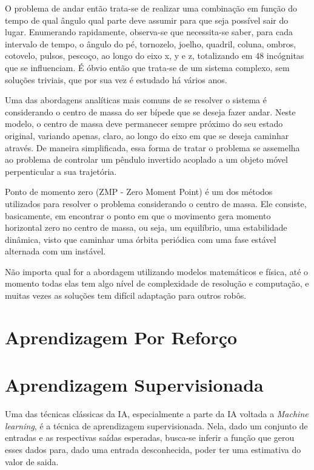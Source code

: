 \documentclass[twoside,conference,a4paper]{IEEEtran}
\begin{document}
O problema de andar então trata-se de realizar uma combinação em função do tempo de qual ângulo qual parte deve assumir para que seja possível sair do lugar. Enumerando rapidamente, observa-se que necessita-se saber, para cada intervalo de tempo, o ângulo do pé, tornozelo, joelho, quadril, coluna, ombros, cotovelo, pulsos, pescoço, ao longo do eixo x, y e z, totalizando em 48 incógnitas que se influenciam. É óbvio então que trata-se de um sistema complexo, sem soluções triviais, que por sua vez é estudado há vários anos.

Uma das abordagens analíticas mais comuns de se resolver o sistema é considerando o centro de massa do ser bípede que se deseja fazer andar. Neste modelo, o centro de massa deve permanecer sempre próximo do seu estado original, variando apenas, claro, ao longo do eixo em que se deseja caminhar através. De maneira simplificada, essa forma de tratar o problema se assemelha ao problema de controlar um pêndulo invertido acoplado a um objeto móvel perpenticular a sua trajetória.

Ponto de momento zero (ZMP - Zero Moment Point) é um dos métodos utilizados para resolver o problema considerando o centro de massa. Ele consiste, basicamente, em encontrar o ponto em que o movimento gera momento horizontal zero no centro de massa, ou seja, um equilíbrio, uma estabilidade dinâmica, visto que caminhar uma órbita periódica com uma fase estável alternada com um instável.

Não importa qual for a abordagem utilizando modelos matemáticos e física, até o momento todas elas tem algo nível de complexidade de resolução e computação, e muitas vezes as soluções tem difícil adaptação para outros robôs.

\section{Aprendizagem Por Reforço} \label{aprendizagem_por_reforco}



\section{Aprendizagem Supervisionada} \label{aprendizagem_supervisionada}

Uma das técnicas clássicas da IA, especialmente a parte da IA voltada a \textsl{Machine learning}, é a técnica de aprendizagem supervisionada. Nela, dado um conjunto de entradas e as respectivas saídas esperadas, busca-se inferir a função que gerou esses dados para, dado uma entrada desconhecida, poder ter uma estimativa do valor de saida.
\end{document}
